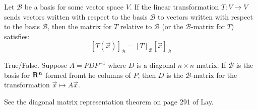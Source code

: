 \documentclass{ximera}
\newcommand{\RR}{\bf R}
\begin{document}
  	  		      	  \begin{question} Let $\mathcal{B}$ be a basis for some vector space $V$. If the linear transformation $T: V\to V$ sends vectors written with respect to the basis $\mathcal{B}$ to vectors written with respect to the basis $\mathcal{B}$, then the matrix for $T$ relative to $\mathcal{B}$  (or the $\mathcal{B}$-matrix for $T$) satisfies: 
  	  		      	  	$$[T(\vec{x})]_\mathcal{B} =[T]_\mathcal{B}[\vec{x}]_\mathcal{B}$$
  	  		      	  	\begin{multipleChoice}
  	  		      	  	\end{multipleChoice}
  	  		      	  	
  	  		      	  \end{question}
  	  		      	   	  \begin{question}True/False. Suppose $A=PDP^{-1}$ where $D$ is a diagonal $n\times n$ matrix. If $\mathcal{B}$ is the basis for $\RR^n$ formed fromt he columns of $P$, then $D$ is the $\mathcal{B}$-matrix for the transformation $\vec{x} \mapsto A\vec{x}$.\\
  	  		      	   	  	
  	  		      	   	  	\begin{multipleChoice}
  	  		      	   	  		\choice[correct]{True}
  	  		      	   	  		\choice{False}
  	  		      	   	  		\end{multipleChoice}
  	  		      	   	  		
  	  		      	   	  		\begin{hint}
  	  		      	   	  			See the diagonal matrix representation theorem on page 291 of Lay.
  	  		      	   	  			\end{hint}
  	  		      	   	  	
  	  		      	   	  \end{question}
\end{document}
